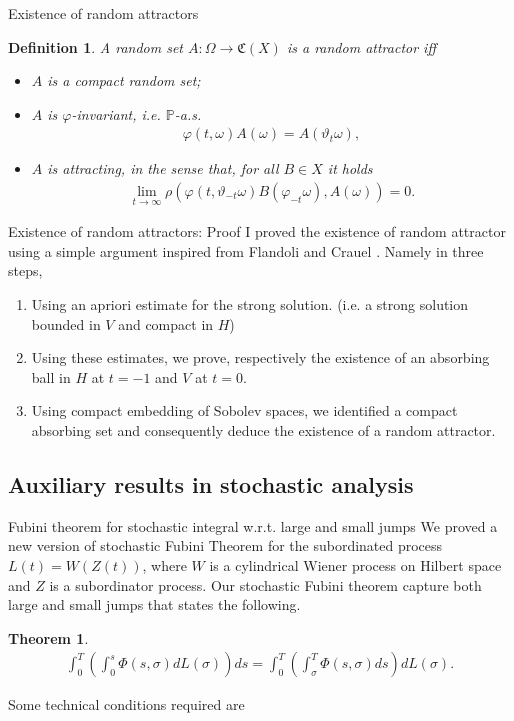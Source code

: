 \documentclass[xcolor=dvipsnames,leqno]{beamer}
\renewcommand{\P}{\mathbb{P}}
\newtheorem{thm}{Theorem}
\newtheorem{defn}{Definition}
\begin{document}
\begin{frame}{Existence of random attractors}
	\begin{defn} A random set $A:\Omega\to\mathfrak{C} (X)$ is a \emph{random attractor} iff
\begin{itemize}
    \item $A$ is a compact random set;
    \item $A$ is $\varphi$-invariant, i.e. $\P$-a.s.
    \begin{align}
        \varphi(t,\omega)A(\omega)=A(\vartheta_t\omega),
    \end{align}
    \item $A$ is attracting, in the sense that, for all $B\in X$ it holds
\begin{align*}
    \lim_{t\to\infty}\rho(\varphi(t,\vartheta_{-t}\omega)B(\varphi_{-t}\omega),A(\omega))=0.
\end{align*}
\end{itemize}
\end{defn}
\end{frame}

\begin{frame}{Existence of random attractors: Proof}
	I proved the existence of random attractor using a simple argument inspired from Flandoli and Crauel \cite{MR1305587}. Namely in three steps,
\begin{enumerate}
	\item Using an apriori estimate for the strong solution. (i.e. a strong solution bounded in $V$ and compact in $H$)
	\item Using these estimates, we prove, respectively the existence of an absorbing ball in $H$ at $t=-1$ and $V$ at $t=0$.
	\item Using compact embedding of Sobolev spaces, we identified a compact absorbing set and consequently deduce the existence of a random attractor.
\end{enumerate}
\end{frame}
\subsection{Auxiliary results in stochastic analysis}
\begin{frame}{Fubini theorem for stochastic integral w.r.t. large and small jumps}
	We proved a new version of stochastic Fubini Theorem for the subordinated process $L(t)=W(Z(t))$, where $W$ is a cylindrical Wiener process on Hilbert space and $Z$ is a subordinator process. Our stochastic Fubini theorem capture both large and small jumps that states the following.
\begin{thm}\label{sfubini}
\begin{align*}\tag{5}
	\int_0^T\left(\int_0^s \Phi(s,\sigma)dL(\sigma)\right)ds=\int_0^T\left(\int_{\sigma}^T \Phi(s,\sigma)ds\right)dL(\sigma).
\end{align*}
\end{thm}
Some technical conditions required are 
\end{frame}
\end{document}
